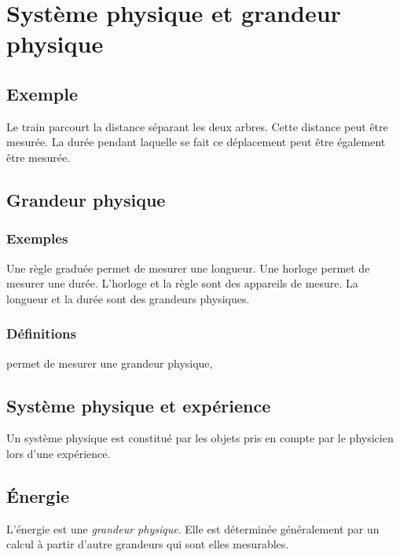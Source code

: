 
\chapter{Système physique et grandeur physique}
%

\section{Exemple}

Le train parcourt la distance séparant les deux arbres. Cette distance peut être mesurée. La durée pendant laquelle se fait ce déplacement peut être également être mesurée.

\section{Grandeur physique}
  \subsection{Exemples}

Une règle graduée permet de mesurer une longueur. Une horloge permet de mesurer une durée. L'horloge et la règle sont des appareils de mesure. La longueur et la durée sont des grandeurs physiques.

  \subsection{Définitions}


 permet de mesurer une grandeur physique,

\section{Système physique et expérience}

Un système physique est constitué par les objets pris en compte par le physicien lors d'une expérience.

\section{Énergie}

L'énergie est une {\it grandeur physique}. Elle est déterminée généralement par un calcul à partir d'autre grandeurs qui sont elles mesurables.

